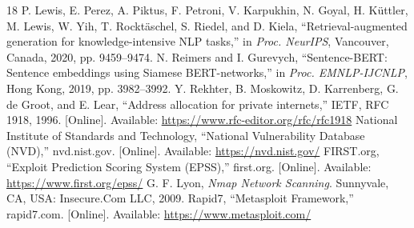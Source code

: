 \documentclass[conference]{IEEEtran}
\begin{document}
\begin{thebibliography}{18}
 P. Lewis, E. Perez, A. Piktus, F. Petroni, V. Karpukhin, N. Goyal, H. K\"uttler, M. Lewis, W. Yih, T. Rockt\"aschel, S. Riedel, and D. Kiela, ``Retrieval-augmented generation for knowledge-intensive NLP tasks,'' in \emph{Proc. NeurIPS}, Vancouver, Canada, 2020, pp. 9459--9474.
 N. Reimers and I. Gurevych, ``Sentence-BERT: Sentence embeddings using Siamese BERT-networks,'' in \emph{Proc. EMNLP-IJCNLP}, Hong Kong, 2019, pp. 3982--3992.
 Y. Rekhter, B. Moskowitz, D. Karrenberg, G. de Groot, and E. Lear, ``Address allocation for private internets,'' IETF, RFC 1918, 1996. [Online]. Available: \url{https://www.rfc-editor.org/rfc/rfc1918}
 National Institute of Standards and Technology, ``National Vulnerability Database (NVD),'' nvd.nist.gov. [Online]. Available: \url{https://nvd.nist.gov/}
 FIRST.org, ``Exploit Prediction Scoring System (EPSS),'' first.org. [Online]. Available: \url{https://www.first.org/epss/}
 G. F. Lyon, \emph{Nmap Network Scanning}. Sunnyvale, CA, USA: Insecure.Com LLC, 2009.
 Rapid7, ``Metasploit Framework,'' rapid7.com. [Online]. Available: \url{https://www.metasploit.com/}
\end{thebibliography}
\end{document}
